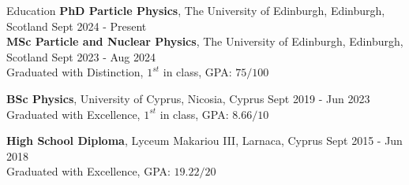 \documentclass{resume} %
\begin{document}
        \begin{rSection}{Education}
                {\bf PhD Particle Physics}, The University of Edinburgh, Edinburgh, Scotland \hfill {Sept 2024 - Present}\\

                {\bf MSc Particle and Nuclear Physics}, The University of Edinburgh, Edinburgh, Scotland \hfill {Sept 2023 - Aug 2024}\\
                Graduated with Distinction, $1^{st}$ in class, GPA: $75/100$
                
                {\bf BSc Physics}, University of Cyprus, Nicosia, Cyprus \hfill {Sept 2019 - Jun 2023}\\
                Graduated with Excellence, $1^{st}$ in class, GPA: $8.66/10$
                
                {\bf High School Diploma}, Lyceum Makariou III, Larnaca, Cyprus \hfill {Sept 2015 - Jun 2018}\\
        Graduated with Excellence, GPA: $19.22/20$
        \end{rSection}

        \bigbreak
\end{document}

